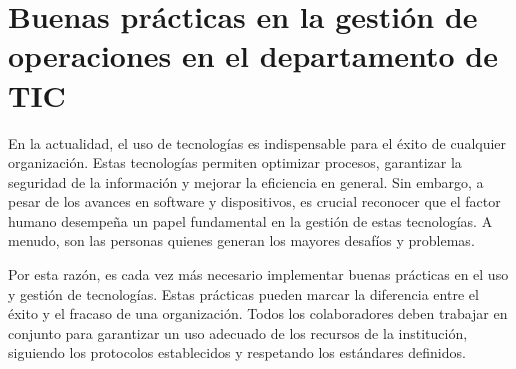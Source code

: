 \documentclass{article}
\begin{document}
\section{Buenas prácticas en la gestión de operaciones en el departamento de TIC}
En la actualidad, el uso de tecnologías es indispensable para el éxito de cualquier organización. Estas tecnologías permiten optimizar procesos, garantizar la seguridad de la información y mejorar la eficiencia en general. Sin embargo, a pesar de los avances en software y dispositivos, es crucial reconocer que el factor humano desempeña un papel fundamental en la gestión de estas tecnologías. A menudo, son las personas quienes generan los mayores desafíos y problemas.

Por esta razón, es cada vez más necesario implementar buenas prácticas en el uso y gestión de tecnologías. Estas prácticas pueden marcar la diferencia entre el éxito y el fracaso de una organización. Todos los colaboradores deben trabajar en conjunto para garantizar un uso adecuado de los recursos de la institución, siguiendo los protocolos establecidos y respetando los estándares definidos.
\end{document}
